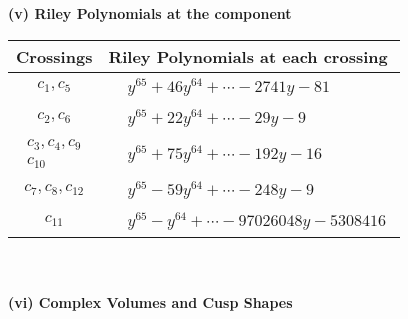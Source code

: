 \documentclass[1p]{elsarticle_modified}
\theoremstyle{definition}
\begin{document}
\newpage\renewcommand{\arraystretch}{1}
\flushleft \textbf{(v) Riley Polynomials at the component}\newline \\
\begin{tabular}{m{50pt}|m{274pt}}
Crossings & \hspace{64pt}Riley Polynomials at each crossing \\
\hline $$\begin{aligned}c_{1},c_{5}\end{aligned}$$&$\begin{aligned}
&y^{65}+46 y^{64}+\cdots-2741 y-81
\end{aligned}$\\
\hline $$\begin{aligned}c_{2},c_{6}\end{aligned}$$&$\begin{aligned}
&y^{65}+22 y^{64}+\cdots-29 y-9
\end{aligned}$\\
\hline $$\begin{aligned}c_{3},c_{4},c_{9}\\c_{10}\end{aligned}$$&$\begin{aligned}
&y^{65}+75 y^{64}+\cdots-192 y-16
\end{aligned}$\\
\hline $$\begin{aligned}c_{7},c_{8},c_{12}\end{aligned}$$&$\begin{aligned}
&y^{65}-59 y^{64}+\cdots-248 y-9
\end{aligned}$\\
\hline $$\begin{aligned}c_{11}\end{aligned}$$&$\begin{aligned}
&y^{65}- y^{64}+\cdots-97026048 y-5308416
\end{aligned}$\\
\hline
\end{tabular}\\~\\
\newpage\flushleft \textbf{(vi) Complex Volumes and Cusp Shapes}
\end{document}
